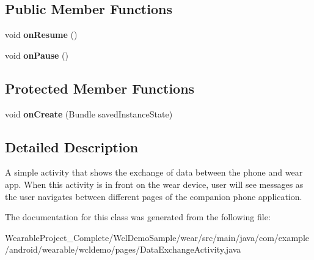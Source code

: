\subsection*{Public Member Functions}
\begin{DoxyCompactItemize}
\item 
void {\bfseries on\+Resume} ()\hypertarget{classcom_1_1example_1_1android_1_1wearable_1_1wcldemo_1_1pages_1_1DataExchangeActivity_a7ce52489a054083d2d19c1e2cc106804}{}\label{classcom_1_1example_1_1android_1_1wearable_1_1wcldemo_1_1pages_1_1DataExchangeActivity_a7ce52489a054083d2d19c1e2cc106804}

\item 
void {\bfseries on\+Pause} ()\hypertarget{classcom_1_1example_1_1android_1_1wearable_1_1wcldemo_1_1pages_1_1DataExchangeActivity_ab97859cfdec28be0807da93e20c49af8}{}\label{classcom_1_1example_1_1android_1_1wearable_1_1wcldemo_1_1pages_1_1DataExchangeActivity_ab97859cfdec28be0807da93e20c49af8}

\end{DoxyCompactItemize}
\subsection*{Protected Member Functions}
\begin{DoxyCompactItemize}
\item 
void {\bfseries on\+Create} (Bundle saved\+Instance\+State)\hypertarget{classcom_1_1example_1_1android_1_1wearable_1_1wcldemo_1_1pages_1_1DataExchangeActivity_ad6e5ce13fdcc9faa09758ff3dd866c45}{}\label{classcom_1_1example_1_1android_1_1wearable_1_1wcldemo_1_1pages_1_1DataExchangeActivity_ad6e5ce13fdcc9faa09758ff3dd866c45}

\end{DoxyCompactItemize}


\subsection{Detailed Description}
A simple activity that shows the exchange of data between the phone and wear app. When this activity is in front on the wear device, user will see messages as the user navigates between different pages of the companion phone application. 

The documentation for this class was generated from the following file\+:\begin{DoxyCompactItemize}
\item 
Wearable\+Project\+\_\+\+Complete/\+Wcl\+Demo\+Sample/wear/src/main/java/com/example/android/wearable/wcldemo/pages/Data\+Exchange\+Activity.\+java\end{DoxyCompactItemize}
